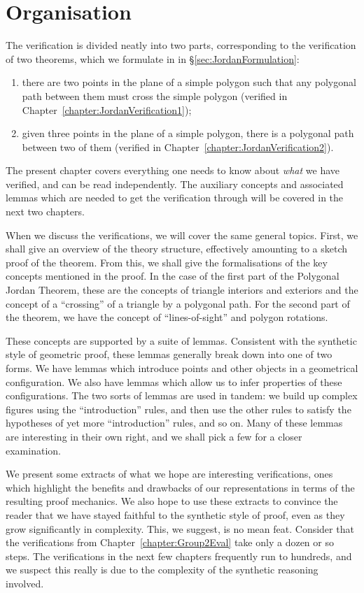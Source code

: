 \section{Organisation}
The verification is divided neatly into two parts, corresponding to the verification of two theorems, which we formulate in in \S\ref{sec:JordanFormulation}:
\begin{enumerate}
  \item there are two points in the plane of a simple polygon such that any polygonal path between them must cross the simple polygon (verified in Chapter~\ref{chapter:JordanVerification1});
  \item given three points in the plane of a simple polygon, there is a polygonal path between two of them (verified in Chapter~\ref{chapter:JordanVerification2}).
\end{enumerate}

The present chapter covers everything one needs to know about \emph{what} we have verified, and can be read independently. The auxiliary concepts and associated lemmas which are needed to get the verification through will be covered in the next two chapters. 

When we discuss the verifications, we will cover the same general topics. First, we shall give an overview of the theory structure, effectively amounting to a sketch proof of the theorem. From this, we shall give the formalisations of the key concepts mentioned in the proof. In the case of the first part of the Polygonal Jordan Theorem, these are the concepts of triangle interiors and exteriors and the concept of a ``crossing'' of a triangle by a polygonal path. For the second part of the theorem, we have the concept of ``lines-of-sight'' and polygon rotations. 

These concepts are supported by a suite of lemmas. Consistent with the synthetic style of geometric proof, these lemmas generally break down into one of two forms. We have lemmas which introduce points and other objects in a geometrical configuration. We also have lemmas which allow us to infer properties of these configurations. The two sorts of lemmas are used in tandem: we build up complex figures using the ``introduction'' rules, and then use the other rules to satisfy the hypotheses of yet more ``introduction'' rules, and so on. Many of these lemmas are interesting in their own right, and we shall pick a few for a closer examination.

We present some extracts of what we hope are interesting verifications, ones which highlight the benefits and drawbacks of our representations in terms of the resulting proof mechanics. We also hope to use these extracts to convince the reader that we have stayed faithful to the synthetic style of proof, even as they grow significantly in complexity. This, we suggest, is no mean feat. Consider that the verifications from Chapter~\ref{chapter:Group2Eval} take only a dozen or so steps. The verifications in the next few chapters frequently run to hundreds, and we suspect this really is due to the complexity of the synthetic reasoning involved.

